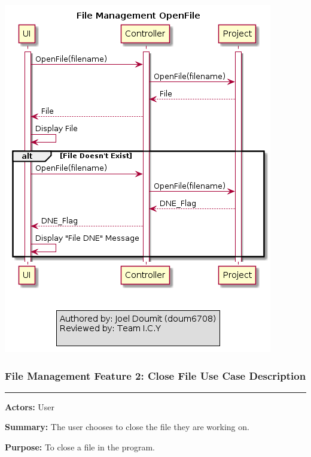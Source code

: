 \documentclass[twoside,letterpaper]{article}
\begin{document}
\includegraphics[width=\textwidth]{images/SequenceDiagrams/FM_OpenFile_Image}

\newpage

\subsubsection[File Management Feature 2: Close File Use Case Description]{\rmfamily\bfseries\color{black}
	File Management Feature 2: Close File Use Case Description}
\hypertarget{RefHeading22059017292}{}

\vspace{2pt}
\hrule
\vspace{8pt}
\textbf{Actors:} User \newline

\noindent\textbf{Summary:} The user chooses to close the file they are working on. \newline

\noindent\textbf{Purpose:} To close a file in the program. \newline
\end{document}

